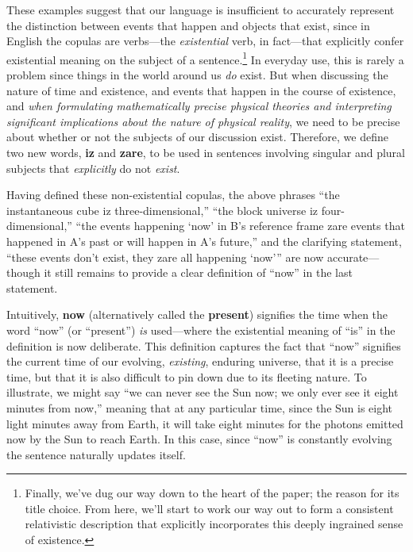 \documentclass[aps,rmp,groupedaddress,twocolumn,10pt]{revtex4-2}
\begin{document}
These examples suggest that our language is insufficient to accurately represent the distinction between events that happen and objects that exist, since in English the copulas are verbs---the \textit{existential} verb, in fact---that explicitly confer existential meaning on the subject of a sentence.\footnote{Finally, we've dug our way down to the heart of the paper; the reason for its title choice. From here, we'll start to work our way out to form a consistent relativistic description that explicitly incorporates this deeply ingrained sense of existence.} In everyday use, this is rarely a problem since things in the world around us \textit{do} exist. But when discussing the nature of time and existence, and events that happen in the course of existence, and \textit{when formulating mathematically precise physical theories and interpreting significant implications about the nature of physical reality}, we need to be precise about whether or not the subjects of our discussion exist. Therefore, we define two new words, \textbf{iz} and \textbf{zare}, to be used in sentences involving singular and plural subjects that \textit{explicitly} do not \textit{exist}.

Having defined these non-existential copulas, the above phrases ``the instantaneous cube iz three-dimensional,'' ``the block universe iz four-dimensional,'' ``the events happening `now' in B's reference frame zare events that happened in A's past or will happen in A's future,'' and the clarifying statement, ``these events don't exist, they zare all happening `now''' are now accurate---though it still remains to provide a clear definition of ``now'' in the last statement. 

Intuitively, \textbf{now} (alternatively called the \textbf{present}) signifies the time when the word ``now'' (or ``present'') \textit{is} used---where the existential meaning of ``is'' in the definition is now deliberate. This definition captures the fact that ``now'' signifies the current time of our evolving, \textit{existing}, enduring universe, that it is a precise time, but that it is also difficult to pin down due to its fleeting nature. To illustrate, we might say ``we can never see the Sun now; we only ever see it eight minutes from now,'' meaning that at any particular time, since the Sun is eight light minutes away from Earth, it will take eight minutes for the photons emitted now by the Sun to reach Earth. In this case, since ``now'' is constantly evolving the sentence naturally updates itself.
\end{document}
